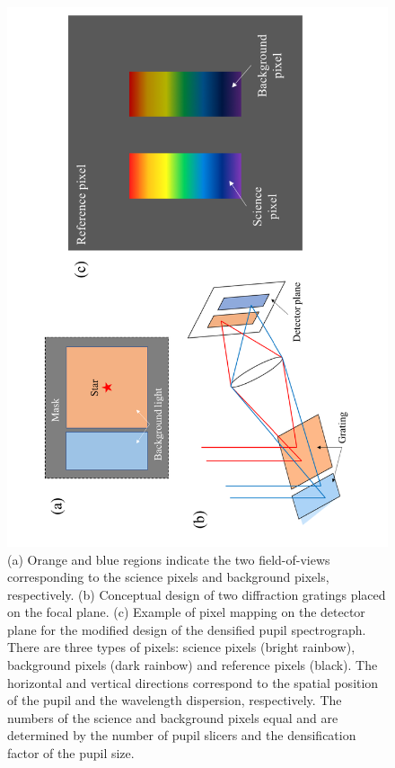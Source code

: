 \documentclass{aastex62}
\begin{document}
\begin{figure}[H]
\begin{center}
\includegraphics[angle=270, width=12cm]{detector_plane.pdf}
\caption{(a) Orange and blue regions indicate the two field-of-views corresponding to the science pixels and background pixels, respectively. (b) Conceptual design of two diffraction gratings placed on the focal plane. (c) Example of pixel mapping on the detector plane for the modified design of the densified pupil spectrograph. There are three types of pixels: science pixels (bright rainbow), background pixels (dark rainbow) and reference pixels (black). The horizontal and vertical directions correspond to the spatial position of the pupil and the wavelength dispersion, respectively. The numbers of the science and background pixels equal and are determined by the number of pupil slicers and the densification factor of the pupil size. \label{fig:detector_plane}}
\end{center}
\end{figure}
\end{document}
